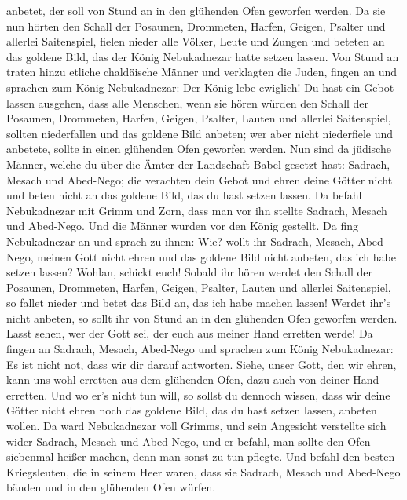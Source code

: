 anbetet, der soll von Stund an in den glühenden Ofen geworfen werden.
 Da sie nun hörten den Schall der Posaunen, Drommeten,
Harfen, Geigen, Psalter und allerlei Saitenspiel, fielen nieder alle
Völker, Leute und Zungen und beteten an das goldene Bild, das der König
Nebukadnezar hatte setzen lassen.  Von Stund an traten hinzu
etliche chaldäische Männer und verklagten die Juden,  fingen
an und sprachen zum König Nebukadnezar: Der König lebe ewiglich!
 Du hast ein Gebot lassen ausgehen, dass alle Menschen,
wenn sie hören würden den Schall der Posaunen, Drommeten, Harfen,
Geigen, Psalter, Lauten und allerlei Saitenspiel, sollten niederfallen
und das goldene Bild anbeten;  wer aber nicht niederfiele
und anbetete, sollte in einen glühenden Ofen geworfen werden.
 Nun sind da jüdische Männer, welche du über die Ämter der
Landschaft Babel gesetzt hast: Sadrach, Mesach und Abed-Nego; die
verachten dein Gebot und ehren deine Götter nicht und beten nicht an das
goldene Bild, das du hast setzen lassen.  Da befahl
Nebukadnezar mit Grimm und Zorn, dass man vor ihn stellte Sadrach,
Mesach und Abed-Nego. Und die Männer wurden vor den König gestellt.
 Da fing Nebukadnezar an und sprach zu ihnen: Wie? wollt
ihr Sadrach, Mesach, Abed-Nego, meinen Gott nicht ehren und das goldene
Bild nicht anbeten, das ich habe setzen lassen?  Wohlan,
schickt euch! Sobald ihr hören werdet den Schall der Posaunen,
Drommeten, Harfen, Geigen, Psalter, Lauten und allerlei Saitenspiel, so
fallet nieder und betet das Bild an, das ich habe machen lassen! Werdet
ihr's nicht anbeten, so sollt ihr von Stund an in den glühenden Ofen
geworfen werden. Lasst sehen, wer der Gott sei, der euch aus meiner Hand
erretten werde!  Da fingen an Sadrach, Mesach, Abed-Nego
und sprachen zum König Nebukadnezar: Es ist nicht not, dass wir dir
darauf antworten.  Siehe, unser Gott, den wir ehren, kann
uns wohl erretten aus dem glühenden Ofen, dazu auch von deiner Hand
erretten.  Und wo er's nicht tun will, so sollst du dennoch
wissen, dass wir deine Götter nicht ehren noch das goldene Bild, das du
hast setzen lassen, anbeten wollen.  Da ward Nebukadnezar
voll Grimms, und sein Angesicht verstellte sich wider Sadrach, Mesach
und Abed-Nego, und er befahl, man sollte den Ofen siebenmal heißer
machen, denn man sonst zu tun pflegte.  Und befahl den
besten Kriegsleuten, die in seinem Heer waren, dass sie Sadrach, Mesach
und Abed-Nego bänden und in den glühenden Ofen würfen. 
